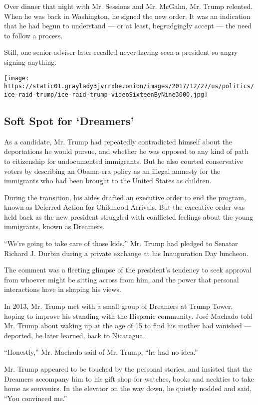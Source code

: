 Over dinner that night with Mr. Sessions and Mr. McGahn, Mr. Trump
relented. When he was back in Washington, he signed the new order. It
was an indication that he had begun to understand --- or at least,
begrudgingly accept --- the need to follow a process.

Still, one senior adviser later recalled never having seen a president
so angry signing anything.

\texttt{[image: https://static01.graylady3jvrrxbe.onion/images/2017/12/27/us/politics/ice-raid-trump/ice-raid-trump-videoSixteenByNine3000.jpg]}

\hypertarget{soft-spot-for-dreamers}{%
\subsection{Soft Spot for `Dreamers'}\label{soft-spot-for-dreamers}}

As a candidate, Mr. Trump had repeatedly contradicted himself about the
deportations he would pursue, and whether he was opposed to any kind of
path to citizenship for undocumented immigrants. But he also courted
conservative voters by describing an Obama-era policy as an illegal
amnesty for the immigrants who had been brought to the United States as
children.

During the transition, his aides drafted an executive order to end the
program, known as Deferred Action for Childhood Arrivals. But the
executive order was held back as the new president struggled with
conflicted feelings about the young immigrants, known as Dreamers.

``We're going to take care of those kids,'' Mr. Trump had pledged to
Senator Richard J. Durbin during a private exchange at his Inauguration
Day luncheon.

The comment was a fleeting glimpse of the president's tendency to seek
approval from whoever might be sitting across from him, and the power
that personal interactions have in shaping his views.

In 2013, Mr. Trump met with a small group of Dreamers at Trump Tower,
hoping to improve his standing with the Hispanic community. José Machado
told Mr. Trump about waking up at the age of 15 to find his mother had
vanished --- deported, he later learned, back to Nicaragua.

``Honestly,'' Mr. Machado said of Mr. Trump, ``he had no idea.''

Mr. Trump appeared to be touched by the personal stories, and insisted
that the Dreamers accompany him to his gift shop for watches, books and
neckties to take home as souvenirs. In the elevator on the way down, he
quietly nodded and said, ``You convinced me.''

